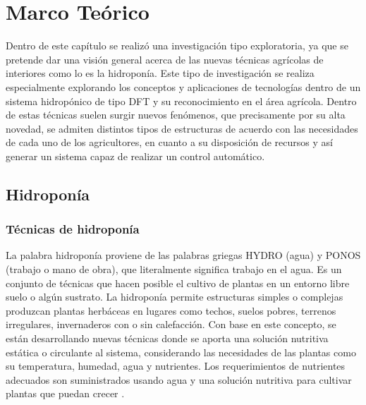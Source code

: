 
\chapter{Marco Teórico} \label{chap:marcoteorico} 
Dentro de este capítulo se realizó una investigación tipo exploratoria, ya que se pretende dar una visión general acerca de las nuevas técnicas agrícolas de interiores como lo es la hidroponía. Este tipo de investigación se realiza especialmente explorando los conceptos y aplicaciones de tecnologías dentro de un sistema hidropónico de tipo DFT y su reconocimiento en el área agrícola. Dentro de estas técnicas suelen surgir nuevos fenómenos, que precisamente por su alta novedad, se admiten distintos tipos de estructuras de acuerdo con las necesidades de cada uno de los agricultores, en cuanto a su disposición de recursos y así generar un sistema capaz de realizar un control automático.

\section{Hidroponía}
\subsection{Técnicas de hidroponía}
La palabra hidroponía proviene de las palabras griegas HYDRO (agua) y PONOS (trabajo o mano de obra), que literalmente significa trabajo en el agua. Es un conjunto de técnicas que hacen posible el cultivo de plantas en un entorno libre suelo o algún sustrato. La hidroponía permite estructuras simples o complejas produzcan plantas herbáceas en lugares como techos, suelos pobres, terrenos irregulares, invernaderos con o sin calefacción. Con base en este concepto, se están desarrollando nuevas técnicas donde se aporta una solución nutritiva estática o circulante al sistema, considerando las necesidades de las plantas como su temperatura, humedad, agua y nutrientes. Los requerimientos de nutrientes adecuados son suministrados usando agua y una solución nutritiva para cultivar plantas que puedan crecer \cite{beltrano_gimenez}.


